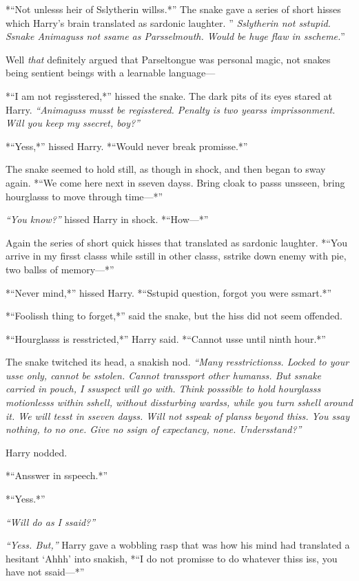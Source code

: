 *``Not unlesss heir of Sslytherin willss.*'' The snake gave a series of
short hisses which Harry's brain translated as sardonic laughter. ''
\emph{Sslytherin not sstupid. Ssnake Animaguss not ssame as
Parsselmouth. Would be huge flaw in sscheme.}''

Well \emph{that} definitely argued that Parseltongue was personal magic,
not snakes being sentient beings with a learnable language---

*``I am not regisstered,*'' hissed the snake. The dark pits of its eyes
stared at Harry. \emph{``Animaguss musst be regisstered. Penalty is two
yearss imprissonment. Will you keep my ssecret, boy?''}

*``Yess,*'' hissed Harry. *``Would never break promisse.*''

The snake seemed to hold still, as though in shock, and then began to
sway again. *``We come here next in sseven dayss. Bring cloak to passs
unsseen, bring hourglasss to move through time---*''

\emph{``You know?''} hissed Harry in shock. *``How---*''

Again the series of short quick hisses that translated as sardonic
laughter. *``You arrive in my firsst classs while sstill in other
classs, sstrike down enemy with pie, two ballss of memory---*''

*``Never mind,*'' hissed Harry. *``Sstupid question, forgot you were
ssmart.*''

*``Foolissh thing to forget,*'' said the snake, but the hiss did not
seem offended.

*``Hourglasss is resstricted,*'' Harry said. *``Cannot usse until ninth
hour.*''

The snake twitched its head, a snakish nod. \emph{``Many resstrictionss.
Locked to your usse only, cannot be sstolen. Cannot transsport other
humanss. But ssnake carried in pouch, I ssuspect will go with. Think
posssible to hold hourglasss motionlesss within sshell, without
dissturbing wardss, while you turn sshell around it. We will tesst in
sseven dayss. Will not sspeak of planss beyond thiss. You ssay nothing,
to no one. Give no ssign of expectancy, none. Undersstand?''}

Harry nodded.

*``Ansswer in sspeech.*''

*``Yess.*''

\emph{``Will do as I ssaid?''}

\emph{``Yess. But,''} Harry gave a wobbling rasp that was how his mind
had translated a hesitant `Ahhh' into snakish, *``I do not promisse to
do whatever thiss iss, you have not ssaid---*''

